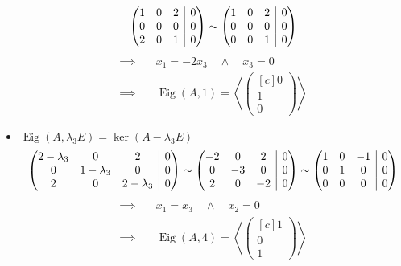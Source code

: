 \documentclass[answers]{exam}
\makeatletter
\newenvironment{sysmatrix}[1]
  {\left(\begin{array}{@{}#1@{}}}
  {\end{array}\right)}
\newcommand{\scalarprod}[1]{\left\langle #1 \right\rangle}
\newcommand{\vektor}[1]{\begin{pmatrix*}[c] #1 \end{pmatrix*}}
\newcommand{\Eig}{\operatorname{Eig}}
\makeatother
\begin{document}
\begin{questions}
\begin{solution}
\begin{itemize}
$$\begin{sysmatrix}{ccc|c}
                          1 & 0 & 2 & 0 \\
                          0 & 0 & 0 & 0 \\
                          2 & 0 & 1 & 0
                      \end{sysmatrix}
                      \sim
                      \begin{sysmatrix}{ccc|c}
                          1 & 0 & 2 & 0 \\
                          0 & 0 & 0 & 0 \\
                          0 & 0 & 1 & 0
                      \end{sysmatrix}
                  $$
                  $$
                      \begin{aligned}
                          \implies & \quad x_1 = -2x_3 \quad \land \quad x_3 = 0 \\
                          \implies & \quad \Eig(A, 1) = \scalarprod{\vektor{0    \\1\\0}}
                      \end{aligned}
                  $$
            \item $\Eig(A, \lambda_3 E) = \ker(A - \lambda_3E)$
                  $$
                      \begin{sysmatrix}{ccc|c}
                          2 - \lambda_3 & 0 & 2 & 0 \\
                          0 & 1 - \lambda_3 & 0 & 0 \\
                          2 & 0 & 2 - \lambda_3 & 0
                      \end{sysmatrix}
                      \sim
                      \begin{sysmatrix}{ccc|c}
                          -2 & 0 & 2 & 0 \\
                          0 & -3 & 0 & 0 \\
                          2 & 0 & -2 & 0
                      \end{sysmatrix}
                      \sim
                      \begin{sysmatrix}{ccc|c}
                          1 & 0 & -1 & 0 \\
                          0 & 1 & 0 & 0 \\
                          0 & 0 & 0 & 0
                      \end{sysmatrix}
                  $$
                  $$
                      \begin{aligned}
                          \implies & \quad x_1 = x_3 \quad \land \quad x_2 = 0 \\
                          \implies & \quad \Eig(A, 4) = \scalarprod{\vektor{1  \\0\\1}}
                      \end{aligned}
                  $$


\end{itemize}
\end{solution}
\end{questions}
\end{document}
